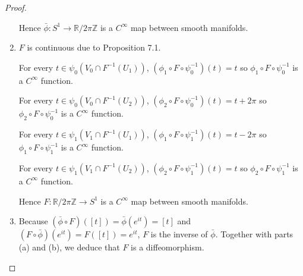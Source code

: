 \begin{proof}
\begin{enumerate}[label={(\alph*)},leftmargin=*]
		      Hence \( \bar{\phi}: S^{1} \to \mathbb{R}/2\pi\mathbb{Z} \) is a \( C^{\infty} \) map between smooth manifolds.
		\item \( F \) is continuous due to Proposition 7.1.

		      For every \( t \in \psi_{0}(V_{0} \cap F^{-1}(U_{1})) \), \( (\phi_{1} \circ F \circ \psi_{0}^{-1})(t) = t \) so \( \phi_{1} \circ F \circ \psi_{0}^{-1} \) is a \( C^{\infty} \) function.

		      For every \( t \in \psi_{0}(V_{0} \cap F^{-1}(U_{2})) \), \( (\phi_{2} \circ F \circ \psi_{0}^{-1})(t) = t + 2\pi \) so \( \phi_{2} \circ F \circ \psi_{0}^{-1} \) is a \( C^{\infty} \) function.

		      For every \( t \in \psi_{1}(V_{1} \cap F^{-1}(U_{1})) \), \( (\phi_{1} \circ F \circ \psi_{1}^{-1})(t) = t - 2\pi \) so \( \phi_{1} \circ F \circ \psi_{1}^{-1} \) is a \( C^{\infty} \) function.

		      For every \( t \in \psi_{1}(V_{1} \cap F^{-1}(U_{2})) \), \( (\phi_{2} \circ F \circ \psi_{1}^{-1})(t) = t \) so \( \phi_{2} \circ F \circ \psi_{1}^{-1} \) is a \( C^{\infty} \) function.

		      Hence \( F: \mathbb{R}/2\pi\mathbb{Z} \to S^{1} \) is a \( C^{\infty} \) map between smooth manifolds.
		\item Because \( (\bar{\phi} \circ F)([t]) = \bar{\phi}(e^{it}) = [t] \) and \( (F\circ \bar{\phi})(e^{it}) = F([t]) = e^{it} \), \( F \) is the inverse of \( \bar{\phi} \). Together with parts (a) and (b), we deduce that \( F \) is a diffeomorphism.
	\end{enumerate}
\end{proof}

